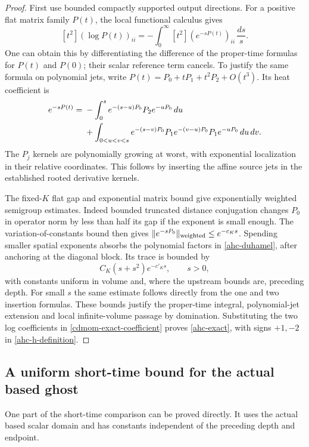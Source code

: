 \documentclass[11pt]{article}
\theoremstyle{remark}
\begin{document}
\begin{proof}
First use bounded compactly supported output directions.
For a positive flat matrix family \(P(t)\), the local
functional calculus gives
\[
 [t^2](\log P(t))_{ii}
    =-\int_0^\infty [t^2](e^{-sP(t)})_{ii}\,\frac{ds}{s}.
\]
One can obtain this by differentiating the difference
of the proper-time formulas for \(P(t)\) and \(P(0)\);
their scalar reference term cancels.
To justify the same formula on polynomial jets, write
\(P(t)=P_0+tP_1+t^2P_2+O(t^3)\). Its heat coefficient is
\begin{align}
 [t^2]e^{-sP(t)}
 ={}&-\int_0^s e^{-(s-u)P_0}P_2e^{-uP_0}\,du \notag\\
 &+\int_{0<u<v<s}
 e^{-(s-v)P_0}P_1e^{-(v-u)P_0}P_1e^{-uP_0}\,du\,dv .
 \label{ahc-duhamel}
\end{align}
The \(P_j\) kernels are polynomially growing at worst,
with exponential localization in their relative
coordinates. This follows by inserting the affine
source jets in the established rooted derivative kernels.

The fixed-\(K\) flat gap and exponential matrix bound
give exponentially weighted semigroup estimates.
Indeed bounded truncated distance conjugation changes
\(P_0\) in operator norm by less than half its gap if
the exponent is small enough. The variation-of-constants
bound then gives
\(\|e^{-sP_0}\|_{\rm weighted}\le e^{-c_Ks}\).
Spending smaller spatial exponents absorbs the
polynomial factors in \eqref{ahc-duhamel}, after
anchoring at the diagonal block. Its trace is bounded by
\[
 C_K(s+s^2)e^{-c'_Ks},\qquad s>0,
\]
with constants uniform in volume and, where the
upstream bounds are, preceding depth. For small \(s\)
the same estimate follows directly from the one and
two insertion formulas. These bounds justify the
proper-time integral, polynomial-jet extension and
local infinite-volume passage by domination.
Substituting the two log coefficients in
\eqref{cdmom-exact-coefficient} proves
\eqref{ahc-exact}, with signs \(+1,-2\) in
\eqref{ahc-h-definition}.
\end{proof}

\subsection{A uniform short-time bound for the actual based ghost}
\label{ahc-ghost-short-section}

One part of the short-time comparison can be proved directly.
It uses the actual based scalar domain and has constants
independent of the preceding depth and endpoint.
\end{document}
